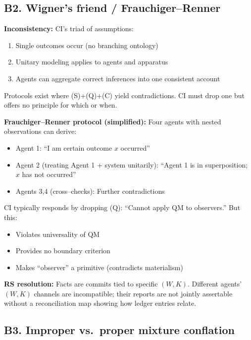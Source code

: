 \documentclass[11pt]{article}
\begin{document}
\subsection{B2. Wigner's friend / Frauchiger--Renner}

\begin{alertbox}
\textbf{Inconsistency:} CI's triad of assumptions:
\begin{enumerate}[label=(\Alph*),nosep]
  \item Single outcomes occur (no branching ontology)
  \item Unitary modeling applies to agents and apparatus
  \item Agents can aggregate correct inferences into one consistent account
\end{enumerate}
Protocols exist where (S)+(Q)+(C) yield contradictions. CI must drop one but offers no principle for which or when.
\end{alertbox}

\textbf{Frauchiger--Renner protocol (simplified):}
Four agents with nested observations can derive:
\begin{itemize}[nosep]
  \item Agent 1: ``I am certain outcome $x$ occurred''
  \item Agent 2 (treating Agent 1 + system unitarily): ``Agent 1 is in superposition; $x$ has not occurred''
  \item Agents 3,4 (cross--checks): Further contradictions
\end{itemize}

CI typically responds by dropping (Q): ``Cannot apply QM to observers.'' But this:
\begin{itemize}[nosep]
  \item Violates universality of QM
  \item Provides no boundary criterion
  \item Makes ``observer'' a primitive (contradicts materialism)
\end{itemize}

\textbf{RS resolution:} Facts are commits tied to specific $(W,K)$. Different agents' $(W,K)$ channels are incompatible; their reports are not jointly assertable without a reconciliation map showing how ledger entries relate.

\subsection{B3. Improper vs.\ proper mixture conflation}
\end{document}
